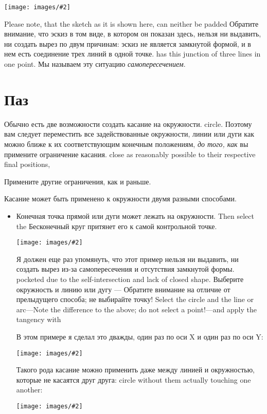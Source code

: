 \documentclass[12pt,titlepage]{article}
\newcommand{\img}[2]{\vspace{2ex}\noindent\texttt{[image: images/\#2]}}
\begin{document}
\begin{description}
      \img{}{PointOnCircle}

      Please note, that the sketch as it is shown here, can neither be padded
      Обратите внимание, что эскиз в том виде, в котором он показан здесь, нельзя ни выдавить, ни создать вырез по двум причинам: эскиз не является замкнутой формой, и в нем есть соединение трех линий в одной точке.
      has this junction of three lines in one point. Мы называем эту ситуацию \emph {самопересечением}.
      \section{Паз}
\item [Касание] Обычно есть две возможности создать касание на окружности.
      circle. Поэтому вам следует переместить все задействованные окружности, линии или дуги как можно ближе к их соответствующим конечным положениям, \emph {до того, как} вы примените ограничение касания.
      close as reasonably possible to their respective final positions,
      \item Примените другие ограничения, как и раньше.

      Касание может быть применено к окружности двумя разными способами. 
      \begin{itemize}
      \item Конечная точка прямой или дуги может лежать на окружности. Then select the
            Бесконечный круг притянет его к самой контрольной точке.
            \label {ConicalTangent}

            \img {} {TangencyCirclePoint}
            
            Я должен еще раз упомянуть, что этот пример нельзя  ни выдавить, ни создать вырез из-за самопересечения и отсутствия замкнутой формы.
            pocketed due to the self-intersection and lack of closed shape.
      Выберите окружность и линию или дугу --- Обратите внимание на отличие от прелыдущего способа; не выбирайте точку! Select the circle and
            the line or arc---Note the difference to the above; do
            not select a point!---and apply the tangency with
            \label {ConicalTangent}
            
            В этом примере я сделал это дважды, один раз по оси X и один раз по оси Y:
            
            \img {scale = 0.9} {TangencyCircleLine}

            Такого рода касание можно  применить даже между линией и окружностью, которые не касаятся друг друга:
            circle without them actually touching one another:

            \img{}{CircleTangentNoTouch}
      \end{itemize}
\end{description}
\end{document}
